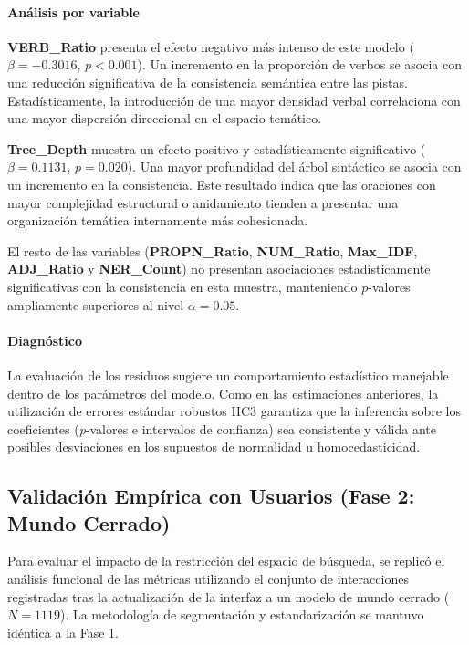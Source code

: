 \paragraph{Análisis por variable}

\textbf{VERB\_Ratio} presenta el efecto negativo más intenso de este modelo ($\beta = -0.3016$, $p < 0.001$). Un incremento en la proporción de verbos se asocia con una reducción significativa de la consistencia semántica entre las pistas. Estadísticamente, la introducción de una mayor densidad verbal correlaciona con una mayor dispersión direccional en el espacio temático.

\textbf{Tree\_Depth} muestra un efecto positivo y estadísticamente significativo ($\beta = 0.1131$, $p = 0.020$). Una mayor profundidad del árbol sintáctico se asocia con un incremento en la consistencia. Este resultado indica que las oraciones con mayor complejidad estructural o anidamiento tienden a presentar una organización temática internamente más cohesionada.

El resto de las variables (\textbf{PROPN\_Ratio}, \textbf{NUM\_Ratio}, \textbf{Max\_IDF}, \textbf{ADJ\_Ratio} y \textbf{NER\_Count}) no presentan asociaciones estadísticamente significativas con la consistencia en esta muestra, manteniendo $p$-valores ampliamente superiores al nivel $\alpha = 0.05$.

\paragraph{Diagnóstico}

La evaluación de los residuos sugiere un comportamiento estadístico manejable dentro de los parámetros del modelo. Como en las estimaciones anteriores, la utilización de errores estándar robustos HC3 garantiza que la inferencia sobre los coeficientes (\textit{p}-valores e intervalos de confianza) sea consistente y válida ante posibles desviaciones en los supuestos de normalidad u homocedasticidad.


\subsection{Validación Empírica con Usuarios (Fase 2: Mundo Cerrado)}

Para evaluar el impacto de la restricción del espacio de búsqueda, se replicó el análisis funcional de las métricas utilizando el conjunto de interacciones registradas tras la actualización de la interfaz a un modelo de mundo cerrado ($N = 1119$). La metodología de segmentación y estandarización se mantuvo idéntica a la Fase 1.

